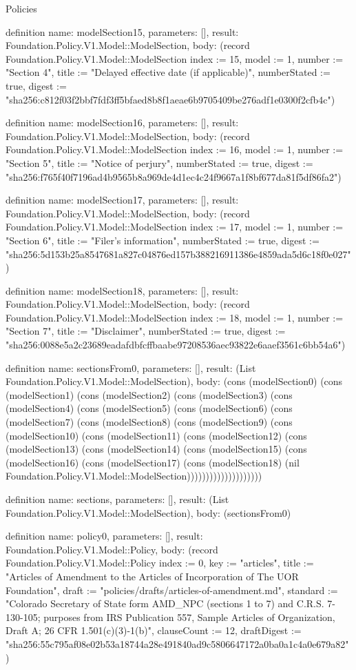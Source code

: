 \begin{lexlean}{Policies}
\begin{semanticmodule}
definition{
  name: modelSection15,
  parameters: [],
  result: Foundation.Policy.V1.Model::ModelSection,
  body: (record Foundation.Policy.V1.Model::ModelSection {index := 15, model := 1, number := "Section 4", title := "Delayed effective date (if applicable)", numberStated := true, digest := "sha256:c812f03f2bbf7fdf3ff5bfaed8b8f1aeae6b9705409be276adf1e0300f2cfb4c"})
}

definition{
  name: modelSection16,
  parameters: [],
  result: Foundation.Policy.V1.Model::ModelSection,
  body: (record Foundation.Policy.V1.Model::ModelSection {index := 16, model := 1, number := "Section 5", title := "Notice of perjury", numberStated := true, digest := "sha256:f765f40f7196ad4b9565b8a969de4d1ec4c24f9667a1f8bf677da81f5df86fa2"})
}

definition{
  name: modelSection17,
  parameters: [],
  result: Foundation.Policy.V1.Model::ModelSection,
  body: (record Foundation.Policy.V1.Model::ModelSection {index := 17, model := 1, number := "Section 6", title := "Filer’s information", numberStated := true, digest := "sha256:5d153b25a8547681a827c04876ed157b388216911386e4859ada5d6c18f0e027"})
}

definition{
  name: modelSection18,
  parameters: [],
  result: Foundation.Policy.V1.Model::ModelSection,
  body: (record Foundation.Policy.V1.Model::ModelSection {index := 18, model := 1, number := "Section 7", title := "Disclaimer", numberStated := true, digest := "sha256:0088e5a2c23689eadafdbfcffbaabe97208536aec93822e6aaef3561c6bb54a6"})
}

definition{
  name: sectionsFrom0,
  parameters: [],
  result: (List Foundation.Policy.V1.Model::ModelSection),
  body: (cons (modelSection0) (cons (modelSection1) (cons (modelSection2) (cons (modelSection3) (cons (modelSection4) (cons (modelSection5) (cons (modelSection6) (cons (modelSection7) (cons (modelSection8) (cons (modelSection9) (cons (modelSection10) (cons (modelSection11) (cons (modelSection12) (cons (modelSection13) (cons (modelSection14) (cons (modelSection15) (cons (modelSection16) (cons (modelSection17) (cons (modelSection18) (nil Foundation.Policy.V1.Model::ModelSection))))))))))))))))))))
}

definition{
  name: sections,
  parameters: [],
  result: (List Foundation.Policy.V1.Model::ModelSection),
  body: (sectionsFrom0)
}

definition{
  name: policy0,
  parameters: [],
  result: Foundation.Policy.V1.Model::Policy,
  body: (record Foundation.Policy.V1.Model::Policy {index := 0, key := "articles", title := "Articles of Amendment to the Articles of Incorporation of The UOR Foundation", draft := "policies/drafts/articles-of-amendment.md", standard := "Colorado Secretary of State form AMD_NPC (sections 1 to 7) and C.R.S. 7-130-105; purposes from IRS Publication 557, Sample Articles of Organization, Draft A; 26 CFR 1.501(c)(3)-1(b)", clauseCount := 12, draftDigest := "sha256:55c795af08e02b53a18744a28e491840ad9c5806647172a0ba0a1c4a0e679a82"})
}


\end{semanticmodule}
\end{lexlean}
